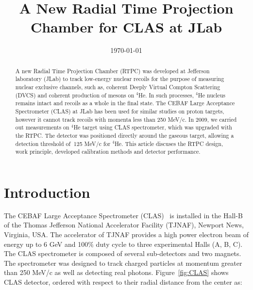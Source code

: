 \documentclass[aps,prl,twocolumn,showpacs,superscriptaddress,groupedaddress]{revtex4}
\begin{document}

\title{\vspace{-15mm}\fontsize{24pt}{10pt}\selectfont\textbf{A New Radial Time 
Projection Chamber for CLAS at JLab}}
  

\date{\today}

\begin{abstract}
A new Radial Time Projection Chamber (RTPC) was developed at Jefferson 
laboratory (JLab) to track low-energy nuclear recoils for the purpose of 
measuring nuclear exclusive channels, such as, coherent Deeply Virtual Compton 
Scattering (DVCS) and coherent production of mesons on $^4$He. In such 
processes, $^4$He nucleus remains intact and recoils as a whole in the final 
state. The CEBAF Large Acceptance Spectrometer (CLAS) at JLab has been used for 
similar studies on proton targets, however it cannot track recoils with momenta 
less than 250 MeV/c. In 2009, we carried out measurements on $^4$He target 
using CLAS spectrometer, which was upgraded with the RTPC. The detector was 
positioned directly around the gaseous target, allowing a detection threshold 
of $~$125  MeV/c for $^4$He. This article discuses the RTPC design, work 
principle, developed calibration methods and detector performance.
\end{abstract}

\maketitle


\section{\label{sec:level1} Introduction}

The CEBAF Large Acceptance Spectrometer (CLAS)~\cite{CLASref} is installed in 
the Hall-B of the Thomas Jefferson National Accelerator Facility (TJNAF), 
Newport News, Virginia, USA. The accelerator of TJNAF provides a high power 
electron beam of energy up to 6 GeV and 100$\%$ duty cycle to three 
experimental Halls (A, B, C). The CLAS spectrometer is composed of several 
sub-detectors and two magnets. The spectrometer was designed to track charged 
particles at momentum greater than 250 MeV/c as well as detecting real photons.  
Figure~\ref{fig:CLAS} shows CLAS detector, ordered with respect to their radial 
distance from the center as:
\end{document}
